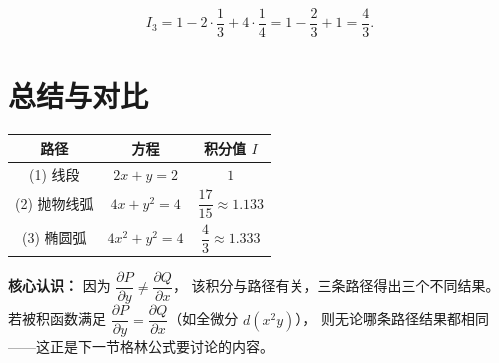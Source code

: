 \documentclass[12pt,a4paper]{ctexart}
\newcommand{\answerbox}[1]{%
  \begin{center}
  \fbox{\color{red}\large\bfseries #1}
  \end{center}
}
\begin{document}
\[
I_3 = 1 - 2 \cdot \frac{1}{3} + 4 \cdot \frac{1}{4}
     = 1 - \frac{2}{3} + 1
     = \frac{4}{3}.
\]

\answerbox{$I_3 = \dfrac{4}{3}$}

\section*{总结与对比}

\begin{center}
\renewcommand{\arraystretch}{1.6}
\begin{tabular}{|c|c|c|}
  \hline
  \textbf{路径} & \textbf{方程} & \textbf{积分值 $I$} \\
  \hline
  (1) 线段      & $2x + y = 2$       & $1$ \\[4pt]
  \hline
  (2) 抛物线弧  & $4x + y^2 = 4$     & $\dfrac{17}{15} \approx 1.133$ \\[4pt]
  \hline
  (3) 椭圆弧    & $4x^2 + y^2 = 4$  & $\dfrac{4}{3} \approx 1.333$ \\[4pt]
  \hline
\end{tabular}
\end{center}

\bigskip

\textbf{核心认识：} 因为 $\dfrac{\partial P}{\partial y} \neq \dfrac{\partial Q}{\partial x}$，
该积分与路径有关，三条路径得出三个不同结果。
若被积函数满足 $\dfrac{\partial P}{\partial y} = \dfrac{\partial Q}{\partial x}$（如全微分 $d(x^2y)$），
则无论哪条路径结果都相同——这正是下一节格林公式要讨论的内容。
\end{document}
